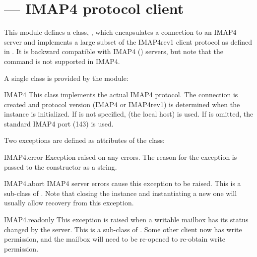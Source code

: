 \section{ ---
         IMAP4 protocol client}




This module defines a class, , which encapsulates a
connection to an IMAP4 server and implements a large subset of the
IMAP4rev1 client protocol as defined in . It is backward
compatible with IMAP4 () servers, but note that the
 command is not supported in IMAP4.

A single class is provided by the  module:

\begin{classdesc}{IMAP4}{}
This class implements the actual IMAP4 protocol.  The connection is
created and protocol version (IMAP4 or IMAP4rev1) is determined when
the instance is initialized.
If  is not specified,  (the local host) is used.
If  is omitted, the standard IMAP4 port (143) is used.
\end{classdesc}

Two exceptions are defined as attributes of the  class:

\begin{excdesc}{IMAP4.error}
Exception raised on any errors.  The reason for the exception is
passed to the constructor as a string.
\end{excdesc}

\begin{excdesc}{IMAP4.abort}
IMAP4 server errors cause this exception to be raised.  This is a
sub-class of .  Note that closing the instance
and instantiating a new one will usually allow recovery from this
exception.
\end{excdesc}

\begin{excdesc}{IMAP4.readonly}
This exception is raised when a writable mailbox has its status changed by the server.  This is a
sub-class of .  Some other client now has write permission,
and the mailbox will need to be re-opened to re-obtain write permission.
\end{excdesc}

